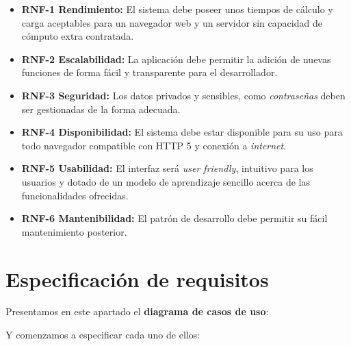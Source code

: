 \begin{itemize}
    \item \textbf{RNF-1 Rendimiento:} El sistema debe poseer unos tiempos de cálculo y carga aceptables para un navegador web y un servidor sin capacidad de cómputo extra contratada.
    \item \textbf{RNF-2 Escalabilidad:} La aplicación debe permitir la adición de nuevas funciones de forma fácil y transparente para el desarrollador.
    \item \textbf{RNF-3 Seguridad:} Los datos privados y sensibles, como \textit{contraseñas} deben ser gestionadas de la forma adecuada.
    \item \textbf{RNF-4 Disponibilidad:} El sistema debe estar disponible para su uso para todo navegador compatible con HTTP 5 y conexión a \textit{internet}.
    \item \textbf{RNF-5 Usabilidad:} El interfaz será \textit{user friendly}, intuitivo para los usuarios y dotado de un modelo de aprendizaje sencillo acerca de las funcionalidades ofrecidas.
    \item \textbf{RNF-6 Mantenibilidad:} El patrón de desarrollo debe permitir su fácil mantenimiento posterior.
\end{itemize}


\section{Especificación de requisitos}

Presentamos en este apartado el \textbf{diagrama de casos de uso}:


Y comenzamos a especificar cada uno de ellos:

